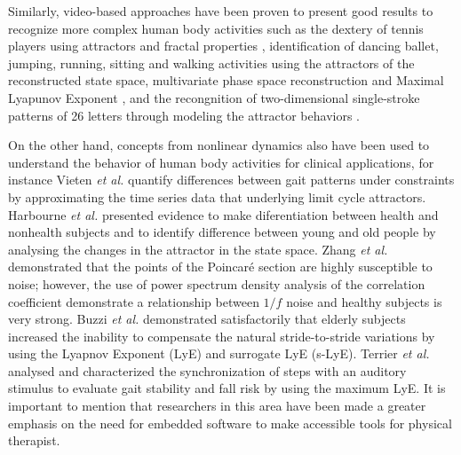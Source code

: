 Similarly, video-based approaches have been proven to present good results 
to recognize more complex human body activities such as the dextery of tennis players 
using attractors and fractal properties \cite{Yamamoto2000,Suzuki2013} 
, identification of dancing ballet, jumping, running, sitting and walking activities
using the attractors of the reconstructed state space, 
multivariate phase space reconstruction
and Maximal Lyapunov Exponent 
\cite{Ali2007,Basharat2009,Venkataraman2013}, and the recongnition of 
two-dimensional single-stroke patterns of 26 letters 
through modeling the attractor behaviors \cite{Ijspeert2013}. 

On the other hand, concepts from nonlinear dynamics also have been used to understand 
the behavior of human body activities for clinical applications, for instance
Vieten \emph{et al.} \cite{Vieten2013} quantify differences between gait patterns 
under constraints by approximating the time series data that underlying limit cycle 
attractors. 
Harbourne \emph{et al.} \cite{Harbourne2009} presented evidence 
to make diferentiation between health and nonhealth subjects and 
to identify difference between young and old people 
by analysing the changes in the attractor in the state space.
Zhang \textit{et al.} \cite{Zhang2010} demonstrated that the points of the 
Poincar\'e section are highly susceptible to noise; however, the use of power 
spectrum density analysis of the correlation coefficient demonstrate a relationship 
between $1/f$ noise and healthy subjects is very strong.
Buzzi \textit{et al.} \cite{Buzzi2003} demonstrated satisfactorily that elderly 
subjects increased the inability to compensate the natural stride-to-stride variations
by using the Lyapnov Exponent (LyE) and surrogate LyE (s-LyE).
Terrier \textit{et al.} \cite{Terrier2013} analysed and characterized the 
synchronization of steps with an auditory stimulus to evaluate gait stability 
and fall risk by using the maximum LyE.
It is important to mention that researchers in this area have been made 
a greater emphasis on the need for embedded software to make accessible 
tools for physical therapist.



